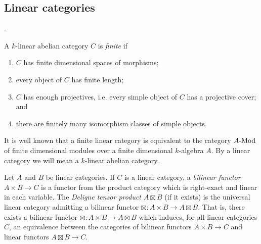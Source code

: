 \documentclass{amsart}
\begin{document}




\subsection{Linear categories} \label{sec-tc-lincat}


.


\CDcomm{[2Vect = idempotent complete additive categories enriched in Vect]}

\begin{definition} %
	A $k$-linear abelian category $C$ is {\em finite} if 
	\begin{enumerate}
		\item $C$ has finite dimensional spaces of morphisms;
		\item every object of $C$ has finite length;
		\item $C$ has enough projectives, i.e. every simple object of $C$ has a projective cover; and
		\item there are finitely many isomorphism classes of simple objects.  
	\end{enumerate}
\end{definition}

It is well known that a finite linear category is equivalent to the category $\Mod{A}{}$ of finite dimensional modules over a finite dimensional $k$-algebra $A$. By a linear category we will mean a $k$-linear abelian category. 


\begin{definition}
	Let $A$ and $B$ be linear categories. If $C$ is a linear category, a {\em bilinear functor} $A \times B \to C$ is a functor from the product category which is right-exact and linear in each variable. The {\em Deligne tensor product $A \boxtimes B$} (if it exists) is the universal linear category admitting a bilinear functor $\boxtimes: A \times B \to A \boxtimes B$. That is, there exists a bilinear functor $\boxtimes: A \times B \to A \boxtimes B$ which induces, for all linear categories $C$, an equivalence between the categories of bilinear functors $A \times B \to C$ and linear functors $A \boxtimes B \to C$. 
\end{definition}
\end{document}
